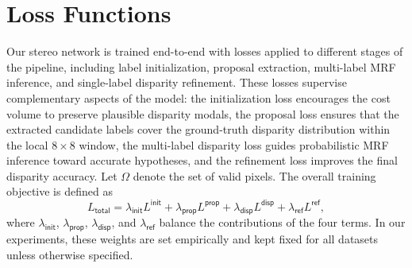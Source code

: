 \section{Loss Functions}
Our stereo network is trained end-to-end with losses applied to different stages of the pipeline, including label initialization, proposal extraction, multi-label MRF inference, and single-label disparity refinement.
These losses supervise complementary aspects of the model: the initialization loss encourages the cost volume to preserve plausible disparity modals, the proposal loss ensures that the extracted candidate labels cover the ground-truth disparity distribution within the local $8\times 8$ window, the multi-label disparity loss guides probabilistic MRF inference toward accurate hypotheses, and the refinement loss improves the final disparity accuracy.
Let $\Omega$ denote the set of valid pixels.
The overall training objective is defined as
\begin{equation}
	L_{\textsf{total}}
	=
	\lambda_{\textsf{init}} L^{\textsf{init}}
	+
	\lambda_{\textsf{prop}} L^{\textsf{prop}}
	+
	\lambda_{\textsf{disp}} L^{\textsf{disp}}
	+
	\lambda_{\textsf{ref}} L^{\textsf{ref}},
	\label{eq:total_loss}
\end{equation}
where $\lambda_{\textsf{init}}$, $\lambda_{\textsf{prop}}$, $\lambda_{\textsf{disp}}$, and $\lambda_{\textsf{ref}}$ balance the contributions of the four terms.
In our experiments, these weights are set empirically and kept fixed for all datasets unless otherwise specified.

